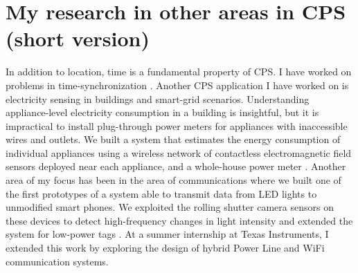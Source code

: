 \documentclass[10pt]{article}
\begin{document}
\section{My research in other areas in CPS (short version)}
In addition to location, time is a fundamental property of CPS. I have worked on problems in time-synchronization \cite{buevich2013hardware, dongare2017pulsar, rtas-alps-platform}. Another CPS application I have worked on is electricity sensing in buildings and smart-grid scenarios.  Understanding appliance-level electricity consumption in a building is insightful, but it is impractical to install plug-through power meters for appliances with inaccessible wires and outlets.  We built a system that estimates the energy consumption of individual appliances using a wireless network of contactless electromagnetic field sensors deployed near each appliance, and a whole-house power meter \cite{rajagopal2013magnetic, rajagopal2013demo}.  Another area of my focus has been in the area of communications where we built one of the first prototypes of a system able to transmit data from LED lights to unmodified smart phones.  We exploited the rolling shutter camera sensors on these devices to detect high-frequency changes in light intensity \cite{rajagopal2014visual, rajagopal2014demonstration} and extended the system for low-power tags \cite{rajagopal2014hybrid}.  At a summer internship at Texas Instruments, I extended this work by exploring the design of hybrid Power Line and WiFi communication systems.






 
\end{document}
